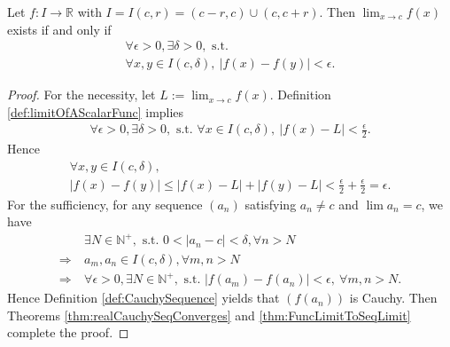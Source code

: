 \begin{thm}
  \label{thm:FuncLimitCauchyCriterion}
  Let $f:I\rightarrow \mathbb{R}$ with
  $I=I(c,r)=(c-r,c)\cup (c,c+r)$.
  Then $\lim_{x\rightarrow c}f(x)$ exists if and only if
  \begin{equation}
    \begin{array}{l}
      \forall \epsilon>0, \exists \delta>0,\text{ s.t. }\\
      \forall x,y\in I(c,\delta),\ |f(x)-f(y)|<\epsilon.
    \end{array}
  \end{equation}
\end{thm}
\begin{proof}
  For the necessity, let $L:=\lim_{x\rightarrow c}f(x)$. Definition
  \ref{def:limitOfAScalarFunc} implies
  \begin{displaymath}
    \begin{array}{l}
      \forall \epsilon>0, \exists \delta>0,\text{ s.t. }
      \forall x\in I(c,\delta),\ |f(x)-L|<\frac{\epsilon}{2}.
    \end{array}
  \end{displaymath}
  Hence 
  \begin{displaymath}
    \begin{array}{l}
      \forall x,y\in I(c,\delta),\\
      |f(x)-f(y)|\le |f(x)-L|+|f(y)-L|
      <\frac{\epsilon}{2}+\frac{\epsilon}{2}=\epsilon.
    \end{array}
  \end{displaymath}
  For the sufficiency, for any sequence $(a_{n})$
  satisfying $a_{n}\neq c$ and $\lim a_{n}=c$, we have
  \begin{align*}
    &\ \exists N\in \mathbb{N}^{+}, \text{ s.t. }
      0<|a_{n}-c|<\delta,\forall n>N\\
    \Rightarrow &\ a_{m},a_{n}\in I(c,\delta), \forall m,n>N\\
    \Rightarrow &\ \forall \epsilon>0, \exists N\in \mathbb{N}^{+},
                  \text{ s.t. } |f(a_{m})-f(a_{n})|<\epsilon,\
                  \forall m,n>N.
  \end{align*}
  Hence Definition \ref{def:CauchySequence} yields that
  $(f(a_{n}))$ is Cauchy. Then
  Theorems \ref{thm:realCauchySeqConverges} and
  \ref{thm:FuncLimitToSeqLimit} complete the proof.
\end{proof}

